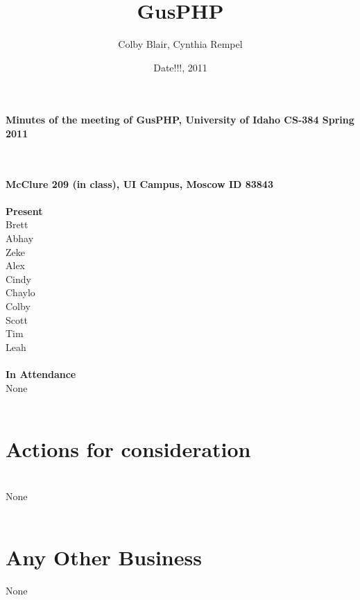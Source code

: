 \documentclass[12pt]{article}
\title{GusPHP}
\date{Date!!!, 2011}
\author{Colby Blair, Cynthia Rempel}
\begin{document}
\maketitle
\begin{center}\textbf{Minutes of the meeting of GusPHP, University of Idaho CS-384 Spring 2011} \end{center} \\ \\
\textbf{McClure 209 (in class), UI Campus, Moscow ID 83843} \\ \\
\textbf{Present}\\ 
Brett\\
Abhay\\
Zeke\\
Alex\\
Cindy\\
Chaylo\\
Colby\\
Scott\\
Tim\\
Leah\\
\\
\textbf{In Attendance}\\ %
None \\
\\
\section{Actions for consideration} \\
None \\
\\
\section{Any Other Business}
None \\
\\
\end{document}
